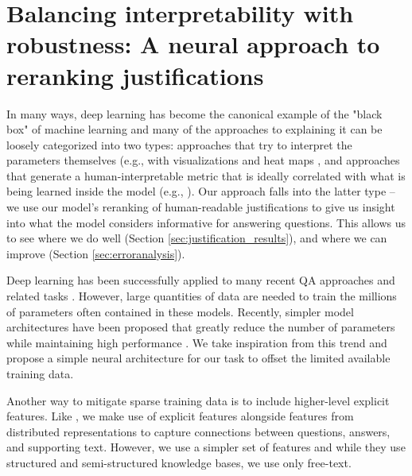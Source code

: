 \section{Balancing interpretability with robustness: A neural approach to reranking justifications}
\label{sec-emnlp2017:intro}

In many ways, deep learning has become the canonical example of the "black box" of machine learning and many of the approaches to explaining it can be loosely categorized into two types: approaches that try to interpret the parameters themselves (e.g., with visualizations and heat maps \citep{Zeiler2014VisualizingAU,nips15_hermann, Li2016VisualizingAU}, and approaches that generate a human-interpretable metric that is ideally correlated with what is being learned inside the model (e.g., \citet{Lei2016RationalizingNP}). Our approach falls into the latter type -- 
we use our model's reranking of human-readable justifications to give us insight into what the model considers informative for answering questions.  This allows us to see where we do well (Section \ref{sec:justification_results}), and where we can improve (Section  \ref{sec:erroranalysis}).

Deep learning has been successfully applied to many recent QA approaches and related tasks \citep[][inter alia]{Bordes2015LargescaleSQ,nips15_hermann, He2016CharacterLevelQA, dong2015question, Tan2016ImprovedRL}.
However, large quantities of data are needed to train the millions of parameters often contained in these models.  
Recently, simpler model architectures have been proposed that greatly reduce the number of parameters while maintaining high performance \cite[e.g.,][]{Iyyer2015,chen2016thorough,Parikh2016ADA}.  
We take inspiration from this trend and propose a simple neural architecture for our task to offset the limited available training data. 

Another way to mitigate sparse training data is to include higher-level explicit features.  Like \citet{sachan2016science}, we make use of explicit features alongside features from distributed representations to capture connections between questions, answers, and supporting text.  However, we use a simpler set of features and while they use structured and semi-structured knowledge bases, we use only free-text.  %

